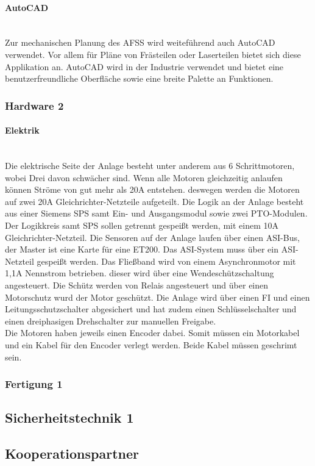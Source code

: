\paragraph{AutoCAD}\mbox{}\\
Zur mechanischen Planung des AFSS wird weiteführend auch AutoCAD verwendet. Vor allem für Pläne von Frästeilen oder Laserteilen bietet sich diese Applikation an. AutoCAD wird in der Industrie verwendet und bietet eine benutzerfreundliche Oberfläche sowie eine breite Palette an Funktionen.
\subsubsection{Hardware 2}

\paragraph{Elektrik}\mbox{}\\
Die elektrische Seite der Anlage besteht unter anderem aus 6 Schrittmotoren, wobei Drei davon schwächer sind. Wenn alle Motoren gleichzeitig anlaufen können Ströme von gut mehr als 20A entstehen. deswegen werden die Motoren auf zwei 20A Gleichrichter-Netzteile aufgeteilt. Die Logik an der Anlage besteht aus einer Siemens SPS samt Ein- und Ausgangsmodul sowie zwei PTO-Modulen. Der Logikkreis samt SPS sollen getrennt gespeißt werden, mit einem 10A Gleichrichter-Netzteil. Die Sensoren auf der Anlage laufen über einen ASI-Bus, der Master ist eine Karte für eine ET200. Das ASI-System muss über ein ASI-Netzteil gespeißt werden. Das Fließband wird von einem Asynchronmotor mit 1,1A Nennstrom betrieben. dieser wird über eine Wendeschützschaltung angesteuert. Die Schütz werden von Relais angesteuert und über einen Motorschutz wurd der Motor geschützt. Die Anlage wird über einen FI und einen Leitungsschutzschalter abgesichert und hat zudem einen Schlüsselschalter und einen dreiphasigen Drehschalter zur manuellen Freigabe.\\
Die Motoren haben jeweils einen Encoder dabei. Somit müssen ein Motorkabel und ein Kabel für den Encoder verlegt werden. Beide Kabel müssen geschrimt sein. 

\subsubsection{Fertigung 1}

\subsection{Sicherheitstechnik 1}

\subsection{Kooperationspartner}